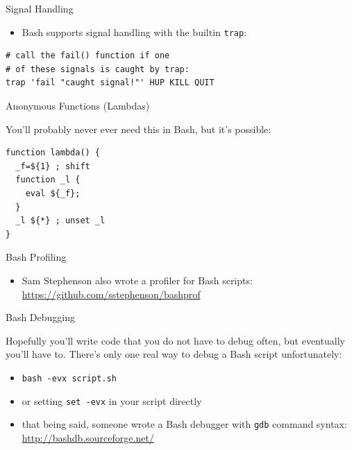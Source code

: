 \begin{frame}[fragile]{Signal Handling}

\begin{itemize}
\itemsep1pt\parskip0pt
\item
  Bash supports signal handling with the builtin \texttt{trap}:
\end{itemize}

\begin{verbatim}
# call the fail() function if one
# of these signals is caught by trap:
trap 'fail "caught signal!"' HUP KILL QUIT
\end{verbatim}

\end{frame}

\begin{frame}[fragile]{Anonymous Functions (Lambdas)}

You'll probably never ever need this in Bash, but it's possible:

\begin{verbatim}
function lambda() {
  _f=${1} ; shift
  function _l {
    eval ${_f};
  }
  _l ${*} ; unset _l
}
\end{verbatim}

\end{frame}

\begin{frame}{Bash Profiling}

\begin{itemize}
\itemsep1pt\parskip0pt
\item
  Sam Stephenson also wrote a profiler for Bash scripts:
  \url{https://github.com/sstephenson/bashprof}
\end{itemize}

\end{frame}

\begin{frame}{Bash Debugging}

Hopefully you'll write code that you do not have to debug often, but
eventually you'll have to. There's only one real way to debug a Bash
script unfortunately:

\begin{itemize}
\itemsep1pt\parskip0pt
\item
  \texttt{bash -evx script.sh}
\item
  or setting \texttt{set -evx} in your script directly
\item
  that being said, someone wrote a Bash debugger with \texttt{gdb}
  command syntax: \url{http://bashdb.sourceforge.net/}
\end{itemize}

\end{frame}

